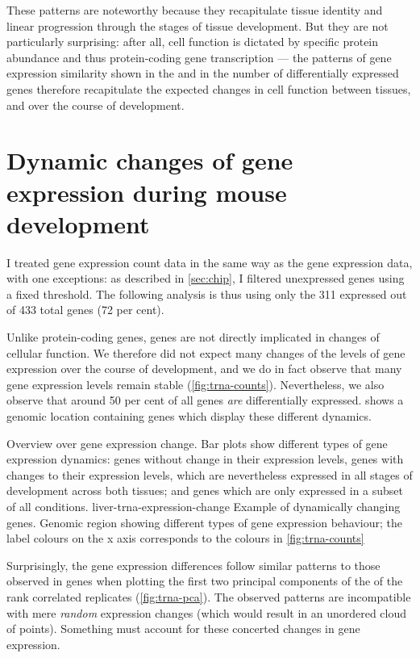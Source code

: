These patterns are noteworthy because they recapitulate tissue identity and
linear progression through the stages of tissue development. But they are not
particularly surprising: after all, cell function is dictated by specific
protein abundance and thus protein-coding gene transcription --- the patterns of
gene expression similarity shown in the \pca and in the number of differentially
expressed genes therefore recapitulate the expected changes in cell function
between tissues, and over the course of development.

\section{Dynamic changes of \trna gene expression during mouse development}

I treated \trna gene expression count data in the same way as the \mrna gene
expression data, with one exceptions: as described in \cref{sec:chip}, I
filtered unexpressed \trna genes using a fixed threshold. The following analysis
is thus using only the \num{311} expressed out of \num{433} total genes
(\num{72} per cent).

Unlike protein-coding genes, \trna genes are not directly implicated in changes
of cellular function. We therefore did not expect many changes of the levels of
\trna gene expression over the course of development, and we do in fact observe
that many \trna gene expression levels remain stable (\cref{fig:trna-counts}).
Nevertheless, we also observe that around \num{50} per cent of all \trna genes
\emph{are} differentially expressed. 
shows a genomic location containing \trna genes which display these different
dynamics.

    {Overview over \trna gene expression change.}
    {Bar plots show different types of \trna gene expression dynamics: \trna
    genes without change in their expression levels, \trna genes with changes to
    their expression levels, which are nevertheless expressed in all stages of
    development across both tissues; and \trna genes which are only expressed in
    a subset of all conditions.}
    {liver-trna-expression-change}
    {Example of dynamically changing \trna genes.}
    {Genomic region showing different types of \trna gene expression behaviour;
    the label colours on the x axis corresponds to the colours in
    \cref{fig:trna-counts}}

Surprisingly, the \trna gene expression differences follow similar patterns to
those observed in \mrna genes when plotting the first two principal components
of the \pca of the rank correlated replicates (\cref{fig:trna-pca}). The
observed patterns are incompatible with mere \emph{random} expression changes
(which would result in an unordered cloud of points). Something must account for
these concerted changes in \trna gene expression.

